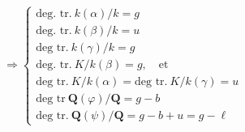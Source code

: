 \[
\Longrightarrow\left\{\begin{array}{l}
\text{deg. tr.}\ k(\alpha)/k=g\\
\text{deg. tr.}\ k(\beta)/k=u\\
\text{deg tr.}\ k(\gamma)/k=g\\[.5em]
\text{deg. tr.}\ K/k(\beta)=g,\quad\text{et}\\
\text{deg tr.}\ K/k(\alpha)=\text{deg tr.}\ K/k(\gamma)=u\\[.5em]
\text{deg tr}\ \mathbf Q(\varphi)/\mathbf Q=g-b\\
\text{deg tr.}\ \mathbf Q(\psi)/\mathbf Q=g-b+u=g-\ell
\end{array}\right.
\]
